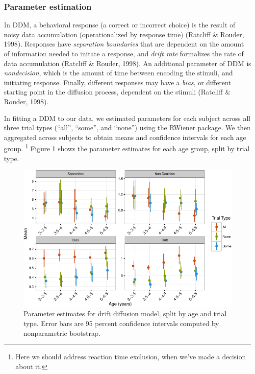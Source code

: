 \documentclass[10pt, letterpaper]{article}
\newenvironment{CodeChunk}{}{}
\begin{document}
\subsubsection{Parameter estimation}\label{parameter-estimation}

In DDM, a behavioral response (a correct or incorrect choice) is the
result of noisy data accumulation (operationalized by response time)
(Ratcliff \& Rouder, 1998). Responses have \emph{separation boundaries}
that are dependent on the amount of information needed to initate a
response, and \emph{drift rate} formalizes the rate of data accumulation
(Ratcliff \& Rouder, 1998). An additional parameter of DDM is
\emph{nondecision}, which is the amount of time between encoding the
stimuli, and initiating response. Finally, different responses may have
a \emph{bias}, or different starting point in the diffusion process,
dependent on the stimuli (Ratcliff \& Rouder, 1998).

In fitting a DDM to our data, we estimated parameters for each subject
across all three trial types (``all'', ``some'', and ``none'') using the
RWiener package. We then aggregated across subjects to obtain means and
confidence intervals for each age group.
\footnote{Here we should address reaction time exclusion, when we've made a decision about it.}
Figure \ref{fig:param_plot} shows the parameter estimates for each age
group, split by trial type.

\begin{CodeChunk}
\begin{figure}[t]

{\centering \includegraphics{figs/param_plot-1} 

}

\caption[Parameter estimates for drift diffusion model, split by age and trial type]{Parameter estimates for drift diffusion model, split by age and trial type. Error bars are 95 percent confidence intervals computed by nonparametric bootstrap.}\label{fig:param_plot}
\end{figure}
\end{CodeChunk}
\end{document}
